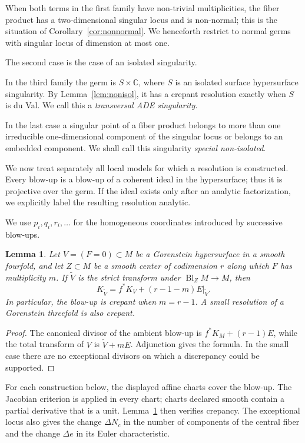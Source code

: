 \documentclass[a4paper]{amsart}
\theoremstyle{plain}
\newtheorem{Lem}[Thm]{Lemma}
\theoremstyle{definition}
\theoremstyle{remark}
\numberwithin{equation}{section}
\newcommand{\CC}{\mathbb{C}}
\begin{document}
When both terms in the first family have non-trivial multiplicities, the
fiber product has a two-dimensional singular locus and is non-normal; this is
the situation of Corollary~\ref{cor:nonnormal}.  We henceforth restrict to
normal germs with singular locus of dimension at most one.

The second case is the case of an isolated singularity.

In the third family the germ is $S\times\CC$, where $S$ is an isolated
surface hypersurface singularity.  By Lemma~\ref{lem:nonisol}, it has a
crepant resolution exactly when $S$ is du Val.  We call this a
\emph{transversal ADE singularity}.

In the last case a singular point of a fiber product belongs to more than one irreducible one-dimensional component of the singular locus or belongs to an embedded component. We shall call this singularity \emph{special non-isolated}.

We now treat separately all local models for which a resolution is
constructed.  Every blow-up is a blow-up of a coherent ideal in the
hypersurface; thus it is projective over the germ.  If the ideal exists only
after an analytic factorization, we explicitly label the resulting
resolution analytic.

We use $p_i,q_i,r_i,\ldots$ for the homogeneous coordinates introduced by
successive blow-ups.

\begin{Lem}\label{lem:crepant-blowup-check}
Let $V=(F=0)\subset M$ be a Gorenstein hypersurface in a smooth fourfold,
and let $Z\subset M$ be a smooth center of codimension $r$ along which $F$
has multiplicity $m$.  If $\widetilde V$ is the strict transform under
$\operatorname{Bl}_Z M\to M$, then
\[
K_{\widetilde V}=f^*K_V+(r-1-m)E|_{\widetilde V}.
\]
In particular, the blow-up is crepant when $m=r-1$.  A small resolution of a
Gorenstein threefold is also crepant.
\end{Lem}
\begin{proof}
The canonical divisor of the ambient blow-up is
$f^*K_M+(r-1)E$, while the total transform of $V$ is
$\widetilde V+mE$.  Adjunction gives the formula.  In the small case there
are no exceptional divisors on which a discrepancy could be supported.
\end{proof}

For each construction below, the displayed affine charts cover the blow-up.
The Jacobian criterion is applied in every chart; charts declared smooth
contain a partial derivative that is a unit.  Lemma~\ref{lem:crepant-blowup-check}
then verifies crepancy.  The exceptional locus also gives the change
$\Delta N_c$ in the number of components of the central fiber and the change
$\Delta e$ in its Euler characteristic.
\end{document}
